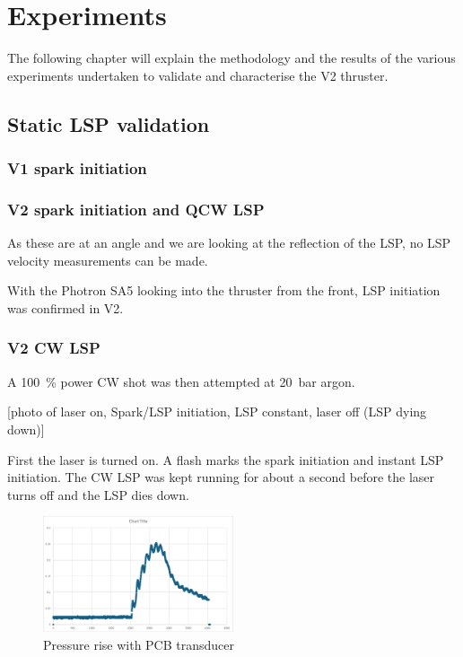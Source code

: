 \chapter{Experiments}

    The following chapter will explain the methodology and the results of the various experiments undertaken to validate and characterise the V2 thruster.

    \section{Static LSP validation}

        \subsection{V1 spark initiation}

        \subsection{V2 spark initiation and QCW LSP}


            As these are at an angle and we are looking at the reflection of the LSP, no LSP velocity measurements can be made.

            With the Photron SA5 looking into the thruster from the front, LSP initiation was confirmed in V2. 

        \subsection{V2 CW LSP}

            A \qty{100}{\%} power CW shot was then attempted at \qty{20}{bar} argon. 

            [photo of laser on, Spark/LSP initiation, LSP constant, laser off (LSP dying down)]

            First the laser is turned on. A flash marks the spark initiation and instant LSP initiation. The CW LSP was kept running for about a second before the laser turns off and the LSP dies down.


            \begin{figure}[!ht]
                \centering
                \includegraphics[width=0.5\textwidth]{assets/4 experiments/CW pressure rise.png}
                \caption{Pressure rise with PCB transducer}
            \end{figure}

